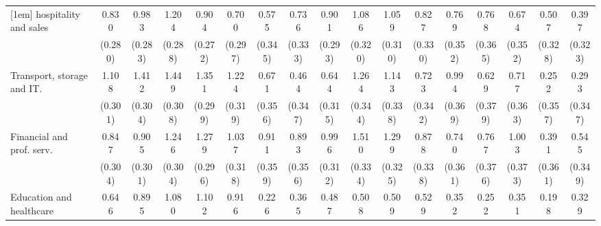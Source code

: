 {\begin{tabular}{l*{16}{c}}
[1em]
hospitality and sales&       0.830\sym{**} &       0.983\sym{***}&       1.204\sym{***}&       0.904\sym{***}&       0.700\sym{*}  &       0.575         &       0.736\sym{*}  &       0.901\sym{**} &       1.086\sym{***}&       1.059\sym{***}&       0.827\sym{*}  &       0.769\sym{*}  &       0.768\sym{*}  &       0.674         &       0.507         &       0.397         \\
                    &     (0.280)         &     (0.283)         &     (0.288)         &     (0.272)         &     (0.297)         &     (0.345)         &     (0.333)         &     (0.293)         &     (0.320)         &     (0.310)         &     (0.330)         &     (0.352)         &     (0.365)         &     (0.352)         &     (0.328)         &     (0.323)         \\
[1em]
Transport, storage and IT.&       1.108\sym{***}&       1.412\sym{***}&       1.449\sym{***}&       1.351\sym{***}&       1.224\sym{***}&       0.671         &       0.464         &       0.644\sym{*}  &       1.264\sym{***}&       1.143\sym{***}&       0.723\sym{*}  &       0.994\sym{**} &       0.629         &       0.717\sym{*}  &       0.252         &       0.293         \\
                    &     (0.301)         &     (0.304)         &     (0.308)         &     (0.299)         &     (0.319)         &     (0.356)         &     (0.347)         &     (0.315)         &     (0.344)         &     (0.338)         &     (0.342)         &     (0.369)         &     (0.379)         &     (0.363)         &     (0.357)         &     (0.347)         \\
[1em]
Financial and prof. serv.&       0.847\sym{**} &       0.905\sym{**} &       1.246\sym{***}&       1.279\sym{***}&       1.037\sym{**} &       0.911\sym{*}  &       0.893\sym{*}  &       0.996\sym{**} &       1.510\sym{***}&       1.299\sym{***}&       0.878\sym{**} &       0.740\sym{*}  &       0.767\sym{*}  &       1.003\sym{**} &       0.391         &       0.545         \\
                    &     (0.304)         &     (0.301)         &     (0.304)         &     (0.296)         &     (0.318)         &     (0.359)         &     (0.356)         &     (0.312)         &     (0.334)         &     (0.325)         &     (0.338)         &     (0.361)         &     (0.376)         &     (0.373)         &     (0.361)         &     (0.349)         \\
[1em]
Education and healthcare&       0.646         &       0.895\sym{**} &       1.080\sym{**} &       1.102\sym{**} &       0.916\sym{*}  &       0.226         &       0.365         &       0.487         &       0.508         &       0.509         &       0.529         &       0.352         &       0.252         &       0.351         &       0.198         &       0.329         \\

\end{tabular}}
